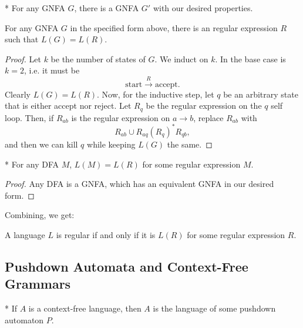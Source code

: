 \begin{fact}*
	For any GNFA $G$, there is a GNFA $G'$ with our desired properties.
\end{fact}

\begin{lem}
	For any GNFA $G$ in the specified form above, there is an  regular expression $R$ such that $L(G) = L(R)$.
\end{lem}

\begin{proof}
	Let $k$ be the number of states of $G$. We induct on $k$. In the base case is $k = 2$, i.e. it must be \[
		\text{start} \stackrel{R}{\longrightarrow} \text{accept}.
	\]
	Clearly $L(G) = L(R)$.
	Now, for the inductive step, let $q$ be an arbitrary state that is either accept nor reject. Let $R_q$ be the regular expression on the $q$ self loop. Then, if $R_{ab}$ is the regular expression on $a\to b$, replace $R_{ab}$ with \[
		R_{ab} \cup R_{aq} (R_q)^* R_{qb},
	\]
	and then we can kill $q$ while keeping $L(G)$ the same.
\end{proof}

\begin{cor}*
	For any DFA $M$, $L(M) = L(R)$ for some regular expression $M$.
\end{cor}

\begin{proof}
	Any DFA is a GNFA, which has an equivalent GNFA in our desired form.
\end{proof}

Combining, we get:

\begin{thm}
	A language $L$ is regular if and only if it is $L(R)$ for some regular expression $R$.
\end{thm}

\subsection{Pushdown Automata and Context-Free Grammars}

\begin{fact}*
	If $A$ is a context-free language, then $A$ is the language of some pushdown automaton $P$.
\end{fact}

